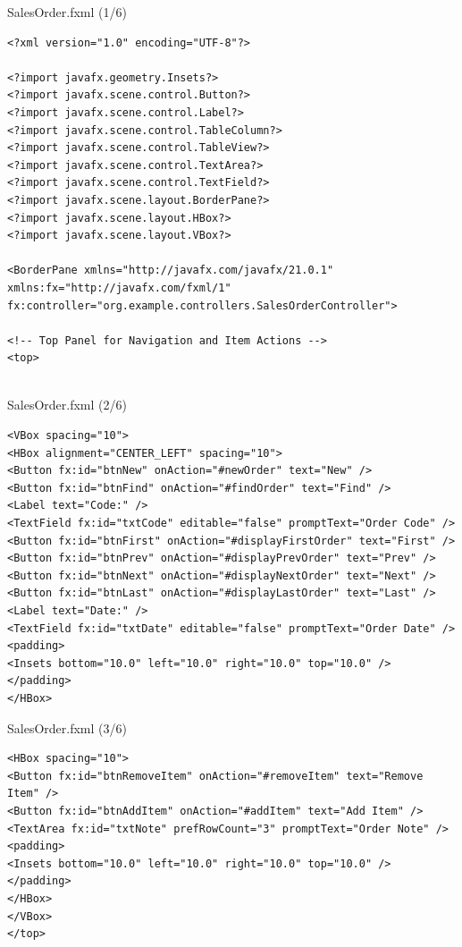 \documentclass[aspectratio=169, table]{beamer}
\begin{document}
\begin{frame}[fragile]{SalesOrder.fxml (1/6)}
\vspace{20pt}
\begin{lstlisting}[style=XmlStyle]
<?xml version="1.0" encoding="UTF-8"?>

<?import javafx.geometry.Insets?>
<?import javafx.scene.control.Button?>
<?import javafx.scene.control.Label?>
<?import javafx.scene.control.TableColumn?>
<?import javafx.scene.control.TableView?>
<?import javafx.scene.control.TextArea?>
<?import javafx.scene.control.TextField?>
<?import javafx.scene.layout.BorderPane?>
<?import javafx.scene.layout.HBox?>
<?import javafx.scene.layout.VBox?>

<BorderPane xmlns="http://javafx.com/javafx/21.0.1" 
xmlns:fx="http://javafx.com/fxml/1" 
fx:controller="org.example.controllers.SalesOrderController">

<!-- Top Panel for Navigation and Item Actions -->
<top>


\end{lstlisting}
\end{frame}

\begin{frame}[fragile]{SalesOrder.fxml (2/6)}
\vspace{20pt}
\begin{lstlisting}[style=XmlStyle]
<VBox spacing="10">
<HBox alignment="CENTER_LEFT" spacing="10">
<Button fx:id="btnNew" onAction="#newOrder" text="New" />
<Button fx:id="btnFind" onAction="#findOrder" text="Find" />
<Label text="Code:" />
<TextField fx:id="txtCode" editable="false" promptText="Order Code" />
<Button fx:id="btnFirst" onAction="#displayFirstOrder" text="First" />
<Button fx:id="btnPrev" onAction="#displayPrevOrder" text="Prev" />
<Button fx:id="btnNext" onAction="#displayNextOrder" text="Next" />
<Button fx:id="btnLast" onAction="#displayLastOrder" text="Last" />
<Label text="Date:" />
<TextField fx:id="txtDate" editable="false" promptText="Order Date" />
<padding>
<Insets bottom="10.0" left="10.0" right="10.0" top="10.0" />
</padding>
</HBox>
\end{lstlisting}
\end{frame}

\begin{frame}[fragile]{SalesOrder.fxml (3/6)}
\vspace{20pt}
\begin{lstlisting}[style=XmlStyle]
<HBox spacing="10">
<Button fx:id="btnRemoveItem" onAction="#removeItem" text="Remove Item" />
<Button fx:id="btnAddItem" onAction="#addItem" text="Add Item" />
<TextArea fx:id="txtNote" prefRowCount="3" promptText="Order Note" />
<padding>
<Insets bottom="10.0" left="10.0" right="10.0" top="10.0" />
</padding>
</HBox>
</VBox>
</top>
\end{lstlisting}
\end{frame}
\end{document}
